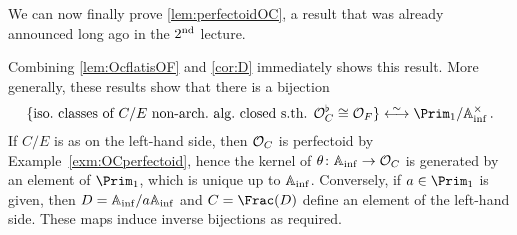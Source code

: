 \documentclass[a4paper, 10pt, oneside, DIV=9, chapterprefix=true, numbers=enddot,bibliography=totoc]{scrbook}
\begin{document}
We can now finally prove \cref{lem:perfectoidOC}, a result that was already announced long ago in the $2^{\text{nd}}$ lecture.
\begin{proof*}
	Combining \cref{lem:OcflatisOF} and \cref{cor:D} immediately shows this result. More generally, these results show that there is a bijection
	\begin{equation*}
		\{\text{iso.\ classes of }C/E\text{ non-arch.\ alg.\ closed s.th. }\Oo_C^\flat\cong \Oo_F\}\lrisomorphism \Prim_1/\IA_\inf^\times\,.
	\end{equation*}
	If $C/E$ is as on the left-hand side, then $\mathcal{O}_C$ is perfectoid by Example~\cref{exm:OCperfectoid}, hence the kernel of $\theta\colon \IA_\inf\morphism\Oo_C$ is generated by an element of $\Prim_1$, which is unique up to $\mathbb{A}_{\mathrm{inf}}$. Conversely, if $a\in \Prim_1$ is given, then $D=\mathbb{A}_{\mathrm{inf}}/a\mathbb{A}_{\mathrm{inf}}$ and $C=\Frac(D)$ define an element of the left-hand side. These maps induce inverse bijections as required.
\end{proof*}
\end{document}
